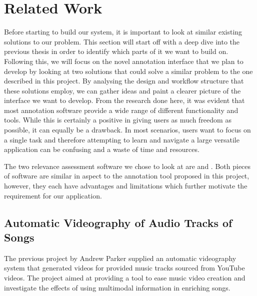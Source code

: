 \documentclass{l4proj}
\begin{document}
\section{Related Work}
Before starting to build our system, it is important to look at similar existing solutions to our problem. This section will start off with a deep dive into the previous thesis in order to identify which parts of it we want to build on. Following this, we will focus on the novel annotation interface that we plan to develop by looking at two solutions that could solve a similar problem to the one described in this project. By analysing the design and workflow structure that these solutions employ, we can gather ideas and paint a clearer picture of the interface we want to develop. From the research done here, it was evident that most annotation software provide a wide range of different functionality and tools. While this is certainly a positive in giving users as much freedom as possible, it can equally be a drawback. In most scenarios, users want to focus on a single task and therefore attempting to learn and navigate a large versatile application can be confusing and a waste of time and resources.

The two relevance assessment software we chose to look at are \cite{labelbox} and \cite{superannotate}. Both pieces of software are similar in aspect to the annotation tool proposed in this project, however, they each have advantages and limitations which further motivate the requirement for our application.

\subsection{Automatic Videography of Audio Tracks of Songs}
\label{sec:background_parker}
The previous project by Andrew Parker supplied an automatic videography system that generated videos for provided music tracks sourced from YouTube videos. The project aimed at providing a tool to ease music video creation and investigate the effects of using multimodal information in enriching songs.
\end{document}
